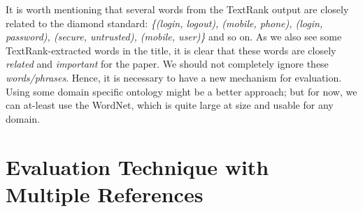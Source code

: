 \documentclass[a4paper]{report}
\begin{document}
\par It is worth mentioning that several words from the TextRank  output are closely related to the diamond standard: \emph{\{(login, logout), (mobile, phone), (login, password), (secure, untrusted), (mobile, user)\}} and so on. As we also see some TextRank-extracted words in the title, it is clear that these words are closely \emph{related} and \emph{important} for the paper. We should not completely ignore these \emph{words/phrases}. Hence, it is necessary to have a new mechanism for evaluation. Using some domain specific ontology might be a better approach; but for now, we can at-least use the WordNet, which is quite large at size and usable for any domain.  

\chapter{Evaluation Technique with Multiple References}
\label{multiple_references}
\end{document}
